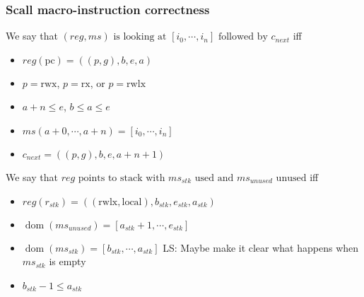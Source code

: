 \documentclass[a4paper]{article}
\DeclareMathOperator{\dom}{dom}
\newcommand\lau[1]{{\color{purple} \sf \footnotesize {LS: #1}}\\}
\newcommand{\var}[1]{\mathit{#1}}
\newcommand{\hs}{\var{ms}}
\newcommand{\ms}{\hs}
\newcommand{\pcreg}{\mathrm{pc}}
\newcommand{\reg}{\var{reg}}
\newcommand{\stk}{\var{stk}}
\newcommand{\plainperm}[1]{\mathrm{#1}}
\newcommand{\exec}{\plainperm{rx}}
\newcommand{\rwx}{\plainperm{rwx}}
\newcommand{\rwlx}{\plainperm{rwlx}}
\newcommand{\local}{\plainperm{local}}
\begin{document}
\subsubsection{Scall macro-instruction correctness}
\begin{definition}
  We say that $(\reg,\ms) \text{ is looking at } [i_0,\cdots,i_n] \text{ followed by } c_{\mathit{next}}$ 
  iff
  \begin{itemize}
  \item $\reg(\pcreg) = ((p,g),b,e,a)$
  \item $p = \rwx$, $p = \exec$, or $p = \rwlx$
  \item $a+n\leq e$, $b\leq a\leq e$
  \item $\ms(a+0,\cdots,a+n) = [i_0,\cdots,i_n]$
  \item $c_{\mathit{next}} = ((p,g),b,e,a+n+1)$
  \end{itemize}
\end{definition}

\begin{definition}
  We say that $\reg \text{ points to stack with $\ms_\stk$ used and $\ms_{\mathit{unused}}$ unused}$
  iff
  \begin{itemize}
  \item $\reg(r_\stk) =((\rwlx,\local),b_\stk,e_\stk,a_\stk)$
  \item $\dom(\ms_{\mathit{unused}}) = [a_\stk+1,\cdots,e_\stk]$
  \item $\dom(\ms_\stk) = [b_\stk,\cdots,a_\stk]$ \lau{Maybe make it clear what happens when $\ms_\stk$ is empty}
  \item $b_\stk - 1\leq a_\stk$
  \end{itemize}
\end{definition}
\end{document}
